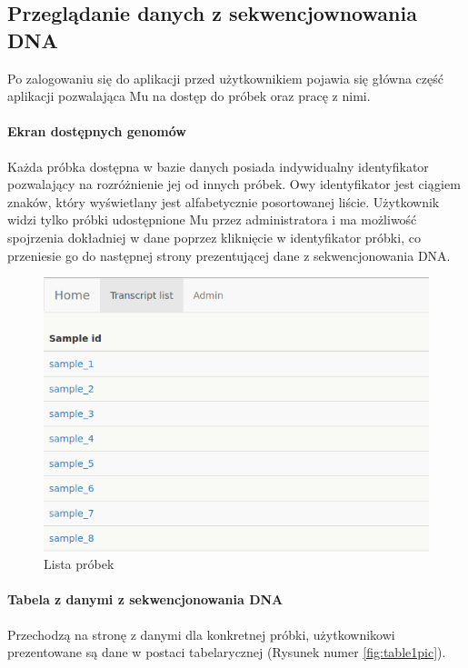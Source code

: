 \documentclass[a4paper,12pt,twoside]{article}
\begin{document}
\newpage  
\subsection{Przeglądanie danych z sekwencjownowania DNA} \label{sssec:dnaPage}
Po zalogowaniu się do aplikacji przed użytkownikiem pojawia się główna część aplikacji pozwalająca Mu 
na dostęp do próbek oraz pracę z nimi. 
 
\paragraph{Ekran dostępnych genomów}
Każda próbka dostępna w bazie danych posiada indywidualny identyfikator pozwalający na 
rozróżnienie jej od innych próbek. Owy identyfikator jest ciągiem znaków, który wyświetlany jest 
alfabetycznie posortowanej liście. Użytkownik widzi tylko próbki udostępnione Mu przez administratora
i ma możliwość spojrzenia dokładniej w dane poprzez kliknięcie w identyfikator próbki,
co przeniesie go do następnej strony prezentującej dane z sekwencjonowania DNA. 


\begin{figure}[h!]
  \includegraphics[width=\linewidth]{obrazy/aplikacja/sample_list.png}
  \caption{Lista próbek}
  \label{fig:sample_listpic}
\end{figure}

\newpage
\paragraph{Tabela z danymi z sekwencjonowania DNA} 
Przechodzą na stronę z danymi dla konkretnej próbki, użytkownikowi prezentowane są 
dane w postaci tabelarycznej (Rysunek numer \ref{fig:table1pic}).
\end{document}
